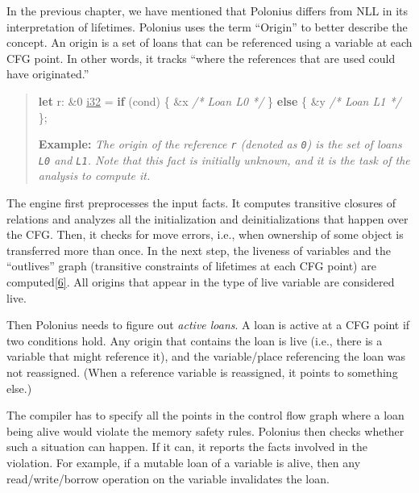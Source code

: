 \documentclass[
  11pt,
  twoside,symmetric]{report}
\newenvironment{Shaded}{}{}
\newcommand{\CharTok}[1]{#1}
\newcommand{\CommentTok}[1]{\textit{#1}}
\newcommand{\ControlFlowTok}[1]{\textbf{#1}}
\newcommand{\DataTypeTok}[1]{\underline{#1}}
\newcommand{\DecValTok}[1]{#1}
\newcommand{\KeywordTok}[1]{\textbf{#1}}
\newcommand{\NormalTok}[1]{#1}
\newcommand{\OperatorTok}[1]{#1}
\begin{document}
In the previous chapter, we have mentioned that Polonius differs from
NLL in its interpretation of lifetimes. Polonius uses the term
``Origin'' to better describe the concept. An origin is a set of loans
that can be referenced using a variable at each CFG point. In other
words, it tracks ``where the references that are used could have
originated.''

\begin{quote}
\begin{Shaded}
\begin{Highlighting}[]
\KeywordTok{let}\NormalTok{ r}\OperatorTok{:} \OperatorTok{\&}\CharTok{\textquotesingle{}}\DecValTok{0} \DataTypeTok{i32} \OperatorTok{=} \ControlFlowTok{if}\NormalTok{ (cond) }\OperatorTok{\{}
        \OperatorTok{\&}\NormalTok{x }\CommentTok{/* Loan L0 */}
    \OperatorTok{\}} \ControlFlowTok{else} \OperatorTok{\{}
        \OperatorTok{\&}\NormalTok{y }\CommentTok{/* Loan L1 */}
    \OperatorTok{\};}
\end{Highlighting}
\end{Shaded}

\textbf{Example:} \emph{The origin of the reference \texttt{r} (denoted
as \texttt{\textquotesingle{}0}) is the set of loans \texttt{L0} and
\texttt{L1}. Note that this fact is initially unknown, and it is the
task of the analysis to compute it.}
\end{quote}

The engine first preprocesses the input facts. It computes transitive
closures of relations and analyzes all the initialization and
deinitializations that happen over the CFG. Then, it checks for move
errors, i.e., when ownership of some object is transferred more than
once. In the next step, the liveness of variables and the ``outlives''
graph (transitive constraints of lifetimes at each CFG point) are
computed\protect\hyperlink{ref-polonius2}{{[}6{]}}. All origins that
appear in the type of live variable are considered live.

Then Polonius needs to figure out \emph{active loans}. A loan is active
at a CFG point if two conditions hold. Any origin that contains the loan
is live (i.e., there is a variable that might reference it), and the
variable/place referencing the loan was not reassigned. (When a
reference variable is reassigned, it points to something else.)

The compiler has to specify all the points in the control flow graph
where a loan being alive would violate the memory safety rules. Polonius
then checks whether such a situation can happen. If it can, it reports
the facts involved in the violation. For example, if a mutable loan of a
variable is alive, then any read/write/borrow operation on the variable
invalidates the loan.
\end{document}
